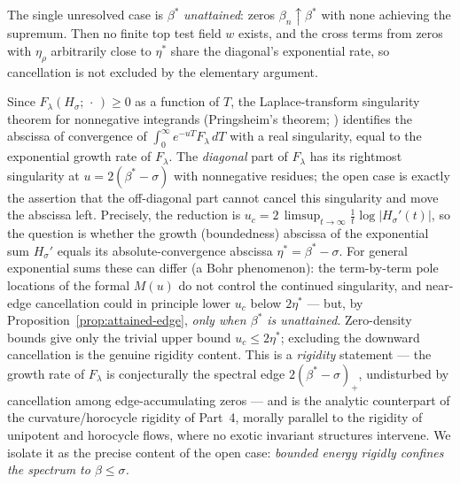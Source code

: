 The single unresolved case is $\beta^\ast$ \emph{unattained}: zeros
$\beta_n\uparrow\beta^\ast$ with none achieving the supremum.  Then no finite top
test field $w$ exists, and the cross terms from zeros with $\eta_\rho$ arbitrarily
close to $\eta^\ast$ share the diagonal's exponential rate, so cancellation is not
excluded by the elementary argument.

\begin{remark}\label{rmk:rigidity}
Since $F_\lambda(H_\sigma;\,\cdot\,)\ge0$ as a function of $T$, the
Laplace-transform singularity theorem for nonnegative integrands
(Pringsheim's theorem; \cite[Ch.~II]{widder}) identifies the abscissa of
convergence of $\int_0^\infty e^{-uT}F_\lambda\,dT$ with a real singularity,
equal to the exponential growth rate of $F_\lambda$.  The \emph{diagonal} part of
$F_\lambda$ has its rightmost singularity at $u=2(\beta^\ast-\sigma)$ with
nonnegative residues; the open case is exactly the assertion that the
off-diagonal part cannot cancel this singularity and move the abscissa left.
Precisely, the reduction is $u_c=2\,\limsup_{t\to\infty}\tfrac1t\log|H_\sigma'(t)|$,
so the question is whether the growth (boundedness) abscissa of the exponential
sum $H_\sigma'$ equals its absolute-convergence abscissa $\eta^\ast=\beta^\ast-\sigma$.
For general exponential sums these can differ (a Bohr phenomenon): the
term-by-term pole locations of the formal $M(u)$ do not control the continued
singularity, and near-edge cancellation could in principle lower $u_c$ below
$2\eta^\ast$ --- but, by Proposition~\ref{prop:attained-edge}, \emph{only when
$\beta^\ast$ is unattained}.  Zero-density bounds give only the trivial upper
bound $u_c\le2\eta^\ast$; excluding the downward cancellation is the genuine
rigidity content.  This
is a \emph{rigidity} statement --- the growth rate of $F_\lambda$ is conjecturally
the spectral edge $2(\beta^\ast-\sigma)_+$, undisturbed by cancellation among
edge-accumulating zeros --- and is the analytic counterpart of the
curvature/horocycle rigidity of Part~4, morally parallel to the rigidity of
unipotent and horocycle flows, where no exotic invariant structures intervene.
We isolate it as the precise content of the open case: \emph{bounded energy
rigidly confines the spectrum to $\beta\le\sigma$.}
\end{remark}

